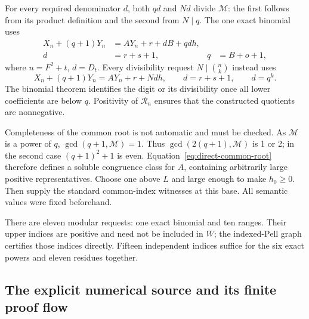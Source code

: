 For every required denominator $d$, both $qd$ and $Nd$ divide
$\mathcal M$: the first follows from its product definition and the
second from $N\mid q$. The one exact binomial uses
\begin{equation}\label{eq:direct-exact-digit}
 \begin{aligned}
 X_n+(q+1)Y_n&=AY_n+r+dB+qd h,\\
 d&=r+s+1,&q&=B+o+1,
 \end{aligned}
\end{equation}
where $n=F^2+t$, $d=D_t$. Every divisibility request
$N\mid\binom nk$ instead uses
\begin{equation}\label{eq:direct-div-digit}
 X_n+(q+1)Y_n=AY_n+r+Nd h,\qquad d=r+s+1,
 \qquad d=q^k.
\end{equation}
The binomial theorem identifies the digit or its divisibility once all
lower coefficients are below $q$. Positivity of $\mathcal R_n$ ensures
that the constructed quotients are nonnegative.

Completeness of the common root is not automatic and must be checked.
As $\mathcal M$ is a power of $q$,
$\gcd(q+1,\mathcal M)=1$. Thus $\gcd(2(q+1),\mathcal M)$ is 1 or 2;
in the second case $(q+1)^2+1$ is even. Equation~\eqref{eq:direct-common-root}
therefore defines a soluble congruence class for $A$, containing arbitrarily
large positive representatives. Choose one above $L$ and large enough to
make $h_0\ge0$. Then supply the standard common-index witnesses at this
base. All semantic values were fixed beforehand.

There are eleven modular requests: one exact binomial and ten ranges.
Their upper indices are positive and need not be included in $W$;
the indexed-Pell graph certifies those indices directly. Fifteen independent
indices suffice for the six exact powers and eleven residues together.

\subsection{The explicit numerical source and its finite proof flow}

